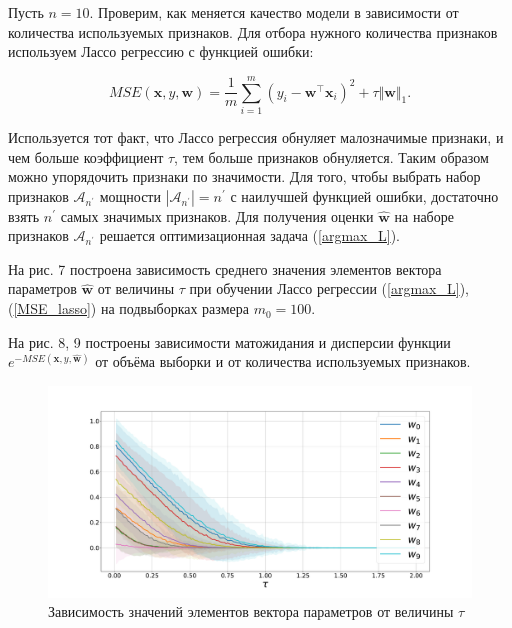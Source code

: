 \documentclass[12pt,twoside]{article}
\begin{document}
Пусть $n = 10$. Проверим, как меняется качество модели в зависимости от количества используемых признаков. Для отбора нужного количества признаков используем Лассо регрессию с функцией ошибки:

\begin{equation}\label{MSE_lasso}
MSE(\mathbf{x}, y, \textbf{w}) = \frac{1}{m}\sum\limits_{i=1}^{m}(y_i - \textbf{w}^{\top}\mathbf{x}_i )^2 + \tau \Vert \mathbf{w}\Vert_1.
\end{equation}

Используется тот факт, что Лассо регрессия обнуляет малозначимые признаки, и чем больше коэффициент $\tau$, тем больше признаков обнуляется. Таким образом можно упорядочить признаки по значимости. Для того, чтобы выбрать набор признаков $\mathcal{A}_{n^{\prime}}$ мощности $|\mathcal{A}_{n^{\prime}}| = n^{\prime}$ с наилучшей функцией ошибки, достаточно взять $n^{\prime}$ самых значимых признаков.  Для получения оценки $\hat{\mathbf{w}}$ на наборе признаков $\mathcal{A}_{n^{\prime}}$ решается оптимизационная задача (\ref{argmax_L}).

На рис. 7 построена зависимость среднего значения элементов вектора параметров $\hat{\mathbf{w}}$ от величины $\tau$ при обучении Лассо регрессии (\ref{argmax_L}), (\ref{MSE_lasso}) на подвыборках размера $m_0 = 100$.

На рис. 8, 9 построены зависимости матожидания и дисперсии функции $e^{-MSE(\mathbf{x}, y, \hat{\mathbf{w}})}$ от объёма выборки и от количества используемых признаков.


\begin{figure}[h!t]\center
\includegraphics[width=1\textwidth]{../data/pics/synthetic_lasso_W.pdf}
\caption{Зависимость значений элементов вектора параметров от величины $\tau$}
\label{fig6}
\end{figure}
\end{document}
